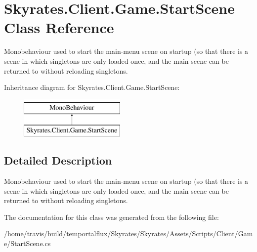 \hypertarget{class_skyrates_1_1_client_1_1_game_1_1_start_scene}{\section{Skyrates.\-Client.\-Game.\-Start\-Scene Class Reference}
\label{class_skyrates_1_1_client_1_1_game_1_1_start_scene}
}


Monobehaviour used to start the main-\/menu scene on startup (so that there is a scene in which singletons are only loaded once, and the main scene can be returned to without reloading singletons.  


Inheritance diagram for Skyrates.\-Client.\-Game.\-Start\-Scene\-:\begin{figure}[H]
\begin{center}
\leavevmode
\includegraphics[height=2.000000cm]{class_skyrates_1_1_client_1_1_game_1_1_start_scene}
\end{center}
\end{figure}


\subsection{Detailed Description}
Monobehaviour used to start the main-\/menu scene on startup (so that there is a scene in which singletons are only loaded once, and the main scene can be returned to without reloading singletons. 



The documentation for this class was generated from the following file\-:\begin{DoxyCompactItemize}
\item 
/home/travis/build/temportalflux/\-Skyrates/\-Skyrates/\-Assets/\-Scripts/\-Client/\-Game/Start\-Scene.\-cs\end{DoxyCompactItemize}
